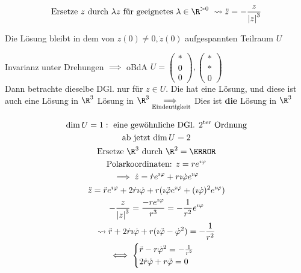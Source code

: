 \begin{bsp*}[note = Zwei Körper Problem]
\begin{gather*}
		\text{Ersetze $z$ durch $\lambda z$ für geeignetes $\lambda \in \R^{>0}$ } \rightsquigarrow \ddot{z} = -\frac{z}{\abs{z}^3}
	\end{gather*}
	\begin{beh}
		Die Lösung bleibt in dem von $z(0) \neq 0 , \dot{z}(0)$ aufgespannten Teilraum $U$ \\
		\begin{bew}[head = Denn:]
			Invarianz unter Drehungen $\implies$ oBdA $U = \begin{pmatrix} * \\ 0 \\ 0 \end{pmatrix} , \begin{pmatrix} * \\ * \\ 0 \end{pmatrix}$ \\
			Dann betrachte dieselbe DGl. nur für $z \in U$. Die hat eine Lösung, und diese ist auch eine Lösung in $\R^3$ Lösung in $\R^3 \underset{\text{Eindeutigkeit}}{\implies}$ Dies ist \textbf{die} Lösung in $\R^3$
		\end{bew}
	\end{beh}
	\begin{gather*}
		\dim U = 1 : \text{ eine gewöhnliche DGl. 2\textsuperscript{ter} Ordnung} \\
		\text{ab jetzt $\dim U = 2$} \\
		\text{Ersetze $\R^3$ durch $\R^2 = \C$} \\
		\text{Polarkoordinaten: } z = r e^{\imath\varphi} \\
		\implies \dot{z} = \dot{r} e^{\imath\varphi} + r \imath \dot{\varphi} e^{\imath\varphi} \\
		\ddot{z} = \ddot{r} e^{\imath\varphi} + 2 \dot{r} \imath \dot{\varphi} + r ( \imath \ddot{\varphi} e^{\imath\varphi} + (\imath \dot{\varphi})^2 e^{\imath\varphi} ) \\
		- \frac{z}{\abs{z}^3} = \frac{-r e^{\imath\varphi}}{r^3} = -\frac{1}{r^2} e^{\imath\varphi} \\
		\rightsquigarrow \ddot{r} + 2 \dot{r} \imath \dot{\varphi} + r ( \imath \ddot{\varphi} - \dot{\varphi}^2 ) = -\frac{1}{r^2} \\
		\iff \begin{cases}
			\ddot{r} - r \dot{\varphi}^2 = -\frac{1}{r^2} \\
			2 \dot{r} \dot{\varphi} + r \ddot{\varphi} = 0 
		\end{cases} \\

\end{gather*}
\end{bsp*}
